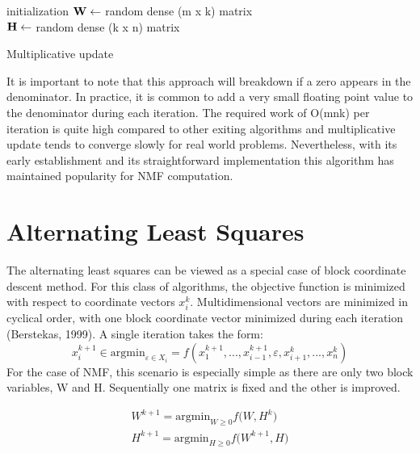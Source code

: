 \documentclass[final,leqno,onefignum,onetabnum]{siamltex1213}
\begin{document}
\begin{algorithm}[H]

 initialization\;
$\bf{W} \gets $ random dense (m x k) matrix\\
$\bf{H} \gets $ random dense (k x n) matrix\\
 \caption{Multiplicative update}
\end{algorithm} 

It is important to note that this approach will breakdown if a zero appears in the denominator. In practice, it is common to add a very small floating point value to the denominator during each iteration. The required work of O(mnk) per iteration is quite high compared to other exiting algorithms and multiplicative update tends to converge slowly for real world problems. Nevertheless, with its early establishment and its straightforward implementation this algorithm has maintained popularity for NMF computation. 

\section{Alternating Least Squares} The alternating least squares can be viewed as a special case of block coordinate descent method. For this class of algorithms, the objective function is minimized with respect to coordinate vectors $x^{k}_{i}$. Multidimensional vectors are minimized in cyclical order, with one block coordinate vector minimized during each iteration (Berstekas, 1999). A single iteration takes the form:
\begin{equation}\label{bcv1}
 x^{k+1}_{i} \in {\mathrm{argmin}_{\varepsilon \in X_i}} = f( x^{k+1}_{1}, ..., x^{k+1}_{i-1}, \varepsilon, x^{k}_{i+1}, ..., x^{k}_{n})
\end{equation}
For the case of NMF, this scenario is especially simple as there are only two block variables, W and H. Sequentially one matrix is fixed and the other is improved. 

\begin{equation}\label{bcv2}
\begin{align} 
W^{k+1} = {\mathrm{argmin}_{W \ge 0} f(W,H^k}) \\
H^{k+1} = {\mathrm{argmin}_{H \ge 0} f(W^{k+1},H})
\end{align}
\end{equation}
\end{document}
